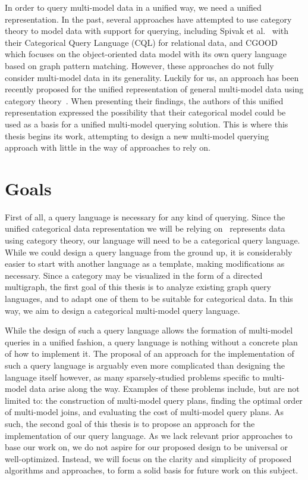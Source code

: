 In order to query multi-model data in a unified way, we need a unified representation.
In the past, several approaches have attempted to use category theory to model data with support for querying, including Spivak et al.~\cite{spivak} with their Categorical Query Language (CQL) for relational data, and CGOOD~\cite{cgood} which focuses on the object-oriented data model with its own query language based on graph pattern matching.
However, these approaches do not fully consider multi-model data in its generality.
Luckily for us, an approach has been recently proposed for the unified representation of general multi-model data using category theory~\cite{one_model}\cite{unified_representation}.
When presenting their findings, the authors of this unified representation expressed the possibility that their categorical model could be used as a basis for a unified multi-model querying solution.
This is where this thesis begins its work, attempting to design a new multi-model querying approach with little in the way of approaches to rely on.

\section*{Goals}

First of all, a query language is necessary for any kind of querying. Since the unified categorical data representation we will be relying on~\cite{one_model}\cite{unified_representation} represents data using category theory, our language will need to be a categorical query language.
While we could design a query language from the ground up, it is considerably easier to start with another language as a template, making modifications as necessary.
Since a category may be visualized in the form of a directed multigraph, the first goal of this thesis is to analyze existing graph query languages, and to adapt one of them to be suitable for categorical data.
In this way, we aim to design a categorical multi-model query language.

While the design of such a query language allows the formation of multi-model queries in a unified fashion, a query language is nothing without a concrete plan of how to implement it.
The proposal of an approach for the implementation of such a query language is arguably even more complicated than designing the language itself however, as many sparsely-studied problems specific to multi-model data arise along the way.
Examples of these problems include, but are not limited to: the construction of multi-model query plans, finding the optimal order of multi-model joins, and evaluating the cost of multi-model query plans.
As such, the second goal of this thesis is to propose an approach for the implementation of our query language.
As we lack relevant prior approaches to base our work on, we do not aspire for our proposed design to be universal or well-optimized.
Instead, we will focus on the clarity and simplicity of proposed algorithms and approaches, to form a solid basis for future work on this subject.

